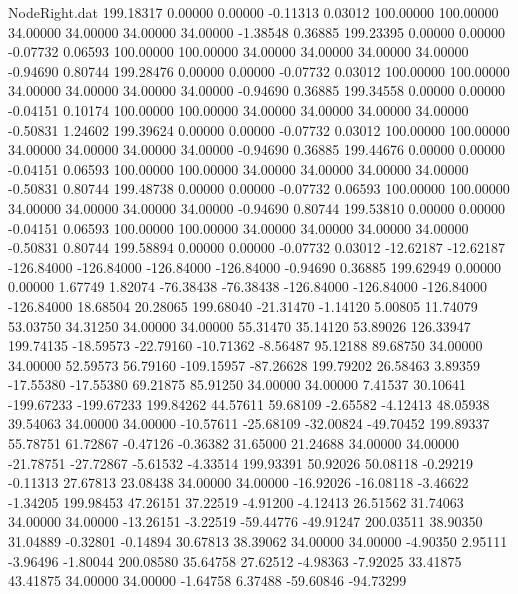 \begin{filecontents}{NodeRight.dat}
 199.18317    0.00000    0.00000    -0.11313    0.03012  100.00000  100.00000   34.00000   34.00000   34.00000   34.00000   -1.38548    0.36885
 199.23395    0.00000    0.00000    -0.07732    0.06593  100.00000  100.00000   34.00000   34.00000   34.00000   34.00000   -0.94690    0.80744
 199.28476    0.00000    0.00000    -0.07732    0.03012  100.00000  100.00000   34.00000   34.00000   34.00000   34.00000   -0.94690    0.36885
 199.34558    0.00000    0.00000    -0.04151    0.10174  100.00000  100.00000   34.00000   34.00000   34.00000   34.00000   -0.50831    1.24602
 199.39624    0.00000    0.00000    -0.07732    0.03012  100.00000  100.00000   34.00000   34.00000   34.00000   34.00000   -0.94690    0.36885
 199.44676    0.00000    0.00000    -0.04151    0.06593  100.00000  100.00000   34.00000   34.00000   34.00000   34.00000   -0.50831    0.80744
 199.48738    0.00000    0.00000    -0.07732    0.06593  100.00000  100.00000   34.00000   34.00000   34.00000   34.00000   -0.94690    0.80744
 199.53810    0.00000    0.00000    -0.04151    0.06593  100.00000  100.00000   34.00000   34.00000   34.00000   34.00000   -0.50831    0.80744
 199.58894    0.00000    0.00000    -0.07732    0.03012  -12.62187  -12.62187 -126.84000 -126.84000 -126.84000 -126.84000   -0.94690    0.36885
 199.62949    0.00000    0.00000     1.67749    1.82074  -76.38438  -76.38438 -126.84000 -126.84000 -126.84000 -126.84000   18.68504   20.28065
 199.68040  -21.31470   -1.14120     5.00805   11.74079   53.03750   34.31250   34.00000   34.00000   55.31470   35.14120   53.89026  126.33947
 199.74135  -18.59573  -22.79160   -10.71362   -8.56487   95.12188   89.68750   34.00000   34.00000   52.59573   56.79160 -109.15957  -87.26628
 199.79202   26.58463    3.89359   -17.55380  -17.55380   69.21875   85.91250   34.00000   34.00000    7.41537   30.10641 -199.67233 -199.67233
 199.84262   44.57611   59.68109    -2.65582   -4.12413   48.05938   39.54063   34.00000   34.00000  -10.57611  -25.68109  -32.00824  -49.70452
 199.89337   55.78751   61.72867    -0.47126   -0.36382   31.65000   21.24688   34.00000   34.00000  -21.78751  -27.72867   -5.61532   -4.33514
 199.93391   50.92026   50.08118    -0.29219   -0.11313   27.67813   23.08438   34.00000   34.00000  -16.92026  -16.08118   -3.46622   -1.34205
 199.98453   47.26151   37.22519    -4.91200   -4.12413   26.51562   31.74063   34.00000   34.00000  -13.26151   -3.22519  -59.44776  -49.91247
 200.03511   38.90350   31.04889    -0.32801   -0.14894   30.67813   38.39062   34.00000   34.00000   -4.90350    2.95111   -3.96496   -1.80044
 200.08580   35.64758   27.62512    -4.98363   -7.92025   33.41875   43.41875   34.00000   34.00000   -1.64758    6.37488  -59.60846  -94.73299

\end{filecontents}
